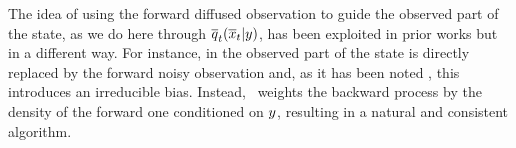 The idea of using the forward diffused observation to guide the observed part of the state, as we do here through $\tfwtrans{t}{\lmeas}{\ltopstate_t}$, has been exploited in prior works but in a different way. For instance, in \cite{song2020score,song2022solving} the observed part of the state is directly replaced by the forward noisy observation and, as it has been noted \cite{trippe2023diffusion}, this introduces an irreducible bias. Instead, \algo\ weights the backward process by the density of the forward one conditioned on $y$, resulting in a natural and consistent algorithm.

